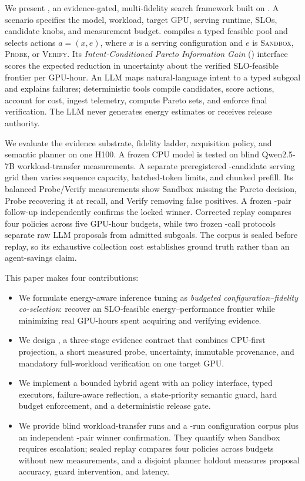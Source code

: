 We present \system{}, an evidence-gated, multi-fidelity search framework built
on \bench{}.  A scenario specifies the model, workload, target GPU, serving
runtime, SLOs, candidate knobs, and measurement budget.  \system{} compiles a
typed feasible pool and selects actions $a=(x,e)$, where $x$ is a serving
configuration and $e$ is \textsc{Sandbox}, \textsc{Probe}, or
\textsc{Verify}.  Its
\emph{Intent-Conditioned Pareto Information Gain} (\ipig{}) interface scores the
expected reduction in uncertainty about the verified SLO-feasible frontier per
GPU-hour.  An LLM maps natural-language intent to a typed subgoal and explains
failures; deterministic tools compile candidates, score actions, account for
cost, ingest telemetry, compute Pareto sets, and enforce final verification.
The LLM never generates energy estimates or receives release authority.

We evaluate the evidence substrate, fidelity ladder, acquisition policy, and
semantic planner on one H100.  A frozen CPU model is tested on
\BlindMeasurements{} blind Qwen2.5-7B workload-transfer measurements.  A
separate preregistered \ConfigurationCandidates{}-candidate serving grid then
varies sequence capacity, batched-token limits, and chunked prefill.  Its
\ConfigurationMeasuredRuns{} balanced Probe/Verify measurements show Sandbox
missing the Pareto decision, Probe recovering it at \LoneParetoRecall{} recall,
and Verify removing false positives.  A frozen \WinnerConfirmationPairs{}-pair
follow-up independently confirms the locked winner.  Corrected replay compares
four policies across five GPU-hour budgets, while two frozen
\PlannerCallsPerSet{}-call protocols separate raw LLM proposals from admitted
subgoals.  The corpus is sealed before replay, so its exhaustive collection
cost establishes ground truth rather than an agent-savings claim.

This paper makes four contributions:
\begin{itemize}
    \item We formulate energy-aware inference tuning as \emph{budgeted
    configuration--fidelity co-selection}: recover an SLO-feasible
    energy--performance frontier while minimizing real GPU-hours spent acquiring
    and verifying evidence.
    \item We design \sandbox{}, a three-stage evidence contract that combines
    CPU-first projection, a short measured probe, uncertainty, immutable
    provenance, and mandatory full-workload verification on one target GPU.
    \item We implement a bounded hybrid agent with an \ipig{} policy interface,
    typed executors, failure-aware reflection, a state-priority semantic guard,
    hard budget enforcement, and a deterministic release gate.
    \item We provide \BlindMeasurements{} blind workload-transfer runs and a
    \ConfigurationMeasuredRuns{}-run configuration corpus plus an independent
    \WinnerConfirmationPairs{}-pair winner confirmation.  They quantify when
    Sandbox requires escalation; sealed replay compares four policies across
    \BudgetLevels{} budgets without new measurements, and a disjoint planner
    holdout measures proposal accuracy, guard intervention, and latency.
\end{itemize}
